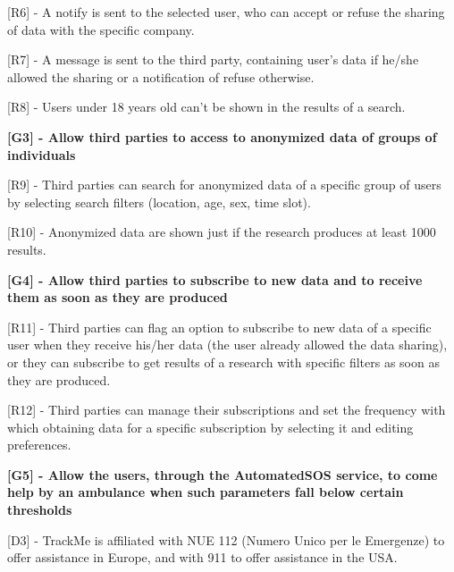 [R6] - A notify is sent to the selected user, who can accept or refuse the sharing of data with the specific company. \newline

[R7] - A message is sent to the third party, containing user's data if he/she allowed the sharing or a notification of refuse otherwise. \newline

[R8] - Users under 18 years old can't be shown in the results of a search. \newline

\hspace{-\parindent}\textbf{[G3] - Allow third parties to access to anonymized data of groups of individuals} \newline

[R9] - Third parties can search for anonymized data of a specific group of users by selecting search filters (location, age, sex, time slot). \newline

[R10] - Anonymized data are shown just if the research produces at least 1000 results. \newline

\hspace{-\parindent}\textbf{[G4] - Allow third parties to subscribe to new data and to receive them as soon as they are produced} \newline

[R11] - Third parties can flag an option to subscribe to new data of a specific user when they receive his/her data (the user already allowed the data sharing), or they can subscribe to get results of a research with specific filters as soon as they are produced. \newline

[R12] - Third parties can manage their subscriptions and set the frequency with which obtaining data for a specific subscription by selecting it and editing preferences. \newline

\hspace{-\parindent}\textbf{[G5] - Allow the users, through the AutomatedSOS service, to come help by an ambulance when such parameters fall below certain thresholds} \newline

[D3] - TrackMe is affiliated with NUE 112 (Numero Unico per le Emergenze) to offer assistance in Europe, and with 911 to offer assistance in the USA. \newline

